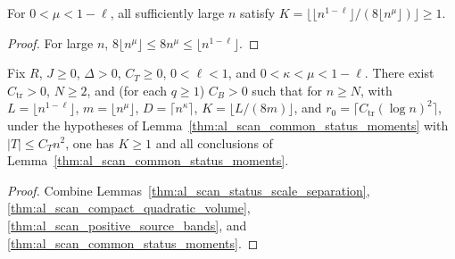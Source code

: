 \begin{lemma}
    \label{thm:al_scan_positive_source_bands}
    For $0<\mu<1-\ell$, all sufficiently large $n$ satisfy
    $K=\lfloor\lfloor n^{1-\ell}\rfloor/(8\lfloor n^\mu\rfloor)\rfloor\ge1$.
\end{lemma}
\begin{proof}
    For large $n$, $8\lfloor n^\mu\rfloor\le 8n^\mu\le\lfloor n^{1-\ell}\rfloor$.
\end{proof}

\begin{lemma}
    \label{thm:al_scan_source_status_moments}
    Fix $R$, $J\ge0$, $\Delta>0$, $C_T\ge0$, $0<\ell<1$, and
    $0<\kappa<\mu<1-\ell$. There exist $C_{\mathrm{tr}}>0$, $N\ge2$, and (for
    each $q\ge1$) $C_B>0$ such that for $n\ge N$, with
    $L=\lfloor n^{1-\ell}\rfloor$, $m=\lfloor n^\mu\rfloor$,
    $D=\lceil n^\kappa\rceil$, $K=\lfloor L/(8m)\rfloor$, and
    $r_0=\lceil C_{\mathrm{tr}}(\log n)^2\rceil$, under the hypotheses of
    Lemma~\ref{thm:al_scan_common_status_moments} with $|T|\le C_Tn^2$, one
    has $K\ge1$ and all conclusions of
    Lemma~\ref{thm:al_scan_common_status_moments}.
\end{lemma}
\begin{proof}
    Combine Lemmas~\ref{thm:al_scan_status_scale_separation},
    \ref{thm:al_scan_compact_quadratic_volume},
    \ref{thm:al_scan_positive_source_bands}, and
    \ref{thm:al_scan_common_status_moments}.
\end{proof}


